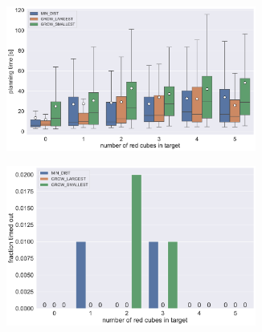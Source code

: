 \begin{figure}
	\centering
	\begin{subfigure}[b]{\textwidth}
		\centering
		\includegraphics[width=0.9\textwidth]{figures/plots/AFNR_time.pdf}
		\caption{}
		\label{fig:AFNR_time}
	\end{subfigure}
	
	\begin{subfigure}[b]{\textwidth}
		\centering
		\includegraphics[width=0.9\textwidth]{figures/plots/AFNR_timeout.pdf}
		\caption{}
		\label{fig:AFNR_timeout}
	\end{subfigure}
	\caption[]{}
	\label{fig:AFNR_timestats}
\end{figure}

